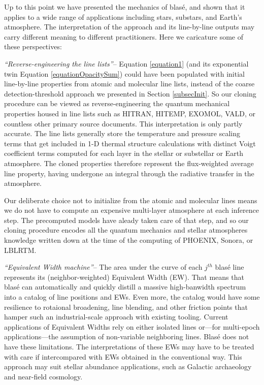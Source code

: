 \documentclass[twocolumn]{aastex631}
\begin{document}
Up to this point we have presented the mechanics of blas\'e, and shown that it applies to a wide range of applications including stars, substars, and Earth's atmosphere. The interpretation of the approach and its line-by-line outputs may carry different meaning to different practitioners.  Here we caricature some of these perspectives:


\emph{``Reverse-engineering the line lists''}-- Equation \ref{equation1} (and its exponential twin Equation \ref{equationOpacitySum}) could have been populated with initial line-by-line properties from atomic and molecular line lists, instead of the coarse detection-threshold approach we presented in Section \ref{subsecInit}.  So our cloning procedure can be viewed as reverse-engineering the quantum mechanical properties housed in line lists such as HITRAN, HITEMP, EXOMOL, VALD, or countless other primary source documents.  This interpretation is only partly accurate.  The line lists generally store the temperature and pressure scaling terms that get included in 1-D thermal structure calculations with distinct Voigt coefficient terms computed for each layer in the stellar or substellar or Earth atmosphere.  The cloned properties therefore represent the flux-weighted average line property, having undergone an integral through the radiative transfer in the atmosphere. 

Our deliberate choice not to initialize from the atomic and molecular lines means we do not have to compute an expensive multi-layer atmosphere at each inference step.  The precomputed models have aleady taken care of that step, and so our cloning procedure encodes all the quantum mechanics and stellar atmospheres knowledge written down at the time of the computing of PHOENIX, Sonora, or LBLRTM.  


\emph{``Equivalent Width machine''}-- The area under the curve of each $j^{th}$ blas\'e line represents its (neighbor-weighted) Equivalent Width (EW).  That means that blas\'e can automatically and quickly distill a massive high-banwidth spectrum into a catalog of line positions and EWs.  Even more, the catalog would have some resilience to rotaional broadening, line blending, and other friction points that hamper such an industrial-scale approach with existing tooling.  Current applications of Equivalent Widths rely on either isolated lines or---for multi-epoch applications---the assumption of non-variable neighboring lines.  Blas\'e does not have these limitations.  The interpretations of these EWs may have to be treated with care if intercompared with EWs obtained in the conventional way.  This approach may suit stellar abundance applications, such as Galactic archaeology and near-field cosmology.
\end{document}
